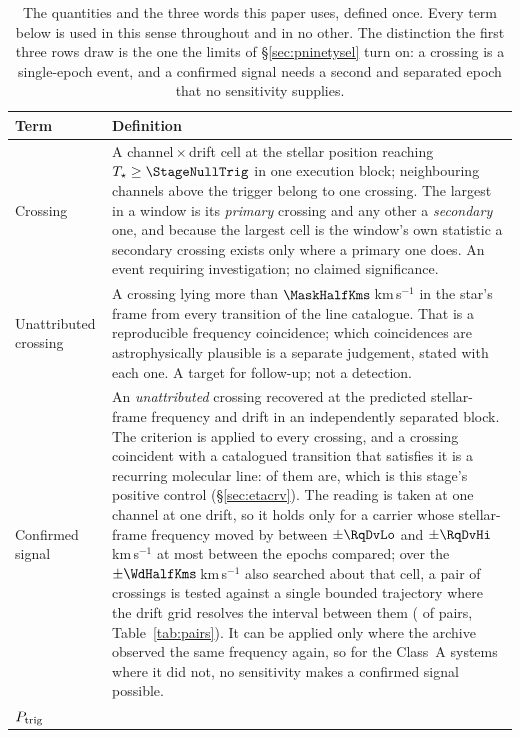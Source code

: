 \begin{table}
\centering
\caption{The quantities and the three words this paper uses, defined once.
Every term below is used in this sense throughout and in no other. The
distinction the first three rows draw is the one the limits of
\S\ref{sec:pninetysel} turn on: a crossing is a single-epoch event, and a
confirmed signal needs a second and separated epoch that no sensitivity
supplies.}
\label{tab:quantities}
\small
\begin{tabular}{@{}p{}p{}@{}}
\hline
Term & Definition \\
\hline
Crossing &
A channel\,$\times$\,drift cell at the stellar position reaching
$T_\star\geq\StageNullTrig$ in one execution block; neighbouring channels
above the trigger belong to one crossing. The largest in a window is its
\emph{primary} crossing and any other a \emph{secondary} one, and because the
largest cell is the window's own statistic a secondary crossing exists only
where a primary one does. An event requiring investigation; no claimed
significance. \\
Unattributed crossing &
A crossing lying more than $\MaskHalfKms$\,km\,s$^{-1}$ in the star's frame
from every transition of the line catalogue. That is a reproducible frequency
coincidence; which coincidences are astrophysically plausible is a separate
judgement, stated with each one. A target for follow-up; not a detection. \\
Confirmed signal &
An \emph{unattributed} crossing recovered at the predicted stellar-frame
frequency and drift in an independently separated block. The criterion is
applied to every crossing, and a crossing coincident with a catalogued
transition that satisfies it is a recurring molecular line:
\MkAttrRecur{} of them are, which is this stage's positive control
(\S\ref{sec:etacrv}). The reading is taken at one channel at one drift, so it
holds only for a carrier whose stellar-frame frequency moved by between
$\pm\RqDvLo$ and $\pm\RqDvHi$\,km\,s$^{-1}$ at most between the epochs
compared; over the $\pm\WdHalfKms$\,km\,s$^{-1}$ also searched about that
cell, a pair of crossings is tested against a single bounded trajectory where
the drift grid resolves the interval between them (\TjNPower{} of \TjNPair{}
pairs, Table~\ref{tab:pairs}). It can be applied only where the archive
observed the same frequency again, so for the \RcNoRepSys{} Class~A systems
where it did not, no sensitivity makes a confirmed signal possible. \\
$P_{\rm trig}$ &

\end{tabular}
\end{table}
